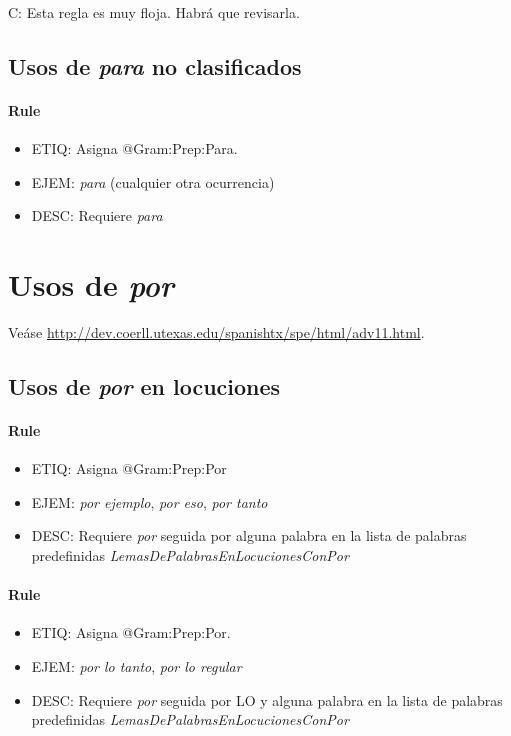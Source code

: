 \documentclass[11pt]{report}
\begin{document}
 C: Esta regla es muy floja. Habrá que revisarla.
\subsection{Usos de \emph{para} no clasificados}
\paragraph*{Rule}
\begin{itemize}
\item ETIQ: Asigna @Gram:Prep:Para.
\item EJEM: \emph{para} (cualquier otra ocurrencia)
\item DESC: Requiere \emph{para}
\end{itemize}

\section{Usos de \emph{por}}
Veáse \url{http://dev.coerll.utexas.edu/spanishtx/spe/html/adv11.html}.

\subsection{Usos de \emph{por} en locuciones}
\paragraph*{Rule}
\begin{itemize}
\item ETIQ: Asigna @Gram:Prep:Por
\item EJEM: \emph{por ejemplo}, \emph{por eso}, \emph{por tanto}
\item DESC: Requiere \emph{por} seguida por alguna palabra en la lista de palabras predefinidas \emph{LemasDePalabrasEnLocucionesConPor}
\end{itemize}

\paragraph*{Rule}
\begin{itemize}
\item ETIQ: Asigna @Gram:Prep:Por.
\item EJEM: \emph{por lo tanto}, \emph{por lo regular}
\item DESC: Requiere \emph{por} seguida por LO y alguna palabra en la lista de palabras predefinidas \emph{LemasDePalabrasEnLocucionesConPor}
\end{itemize}
\end{document}
